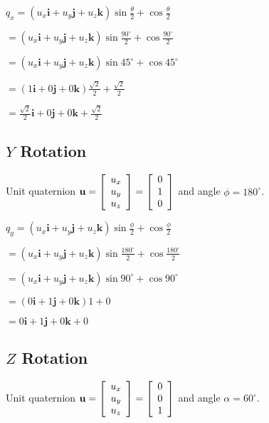 \documentclass[11pt]{article}
\begin{document}
\begin{spacing}{1.2}
$q_x
 = (u_x \mathbf{i} + u_y \mathbf{j} + u_z \mathbf{k}) \sin \frac{\theta}{2} + \cos \frac{\theta}{2}
 $
 
 $ = (u_x \mathbf{i} + u_y \mathbf{j} + u_z \mathbf{k}) \sin \frac{90^{\circ}}{2} + \cos \frac{90^{\circ}}{2}$

 $ = (u_x \mathbf{i} + u_y \mathbf{j} + u_z \mathbf{k}) \sin 45^{\circ} + \cos 45^{\circ}$

 $ = (1 \mathbf{i} + 0\mathbf{j} + 0\mathbf{k}) \frac{\sqrt2}{2} + \frac{\sqrt2}{2}$

 $ =  \frac{\sqrt2}{2}\mathbf{i} + 0\mathbf{j} + 0\mathbf{k}  + \frac{\sqrt2}{2}$

    
\subsection{$Y$ Rotation}

Unit quaternion 
$\displaystyle 
\mathbf{u} = 
\left[
	\begin{array}{c}
		u_x \cr u_y \cr u_z \cr
	\end{array}
\right]
= 
\left[
	\begin{array}{c}
		0 \cr 1 \cr 0 \cr
	\end{array}
\right]
$
and angle $\phi = 180^{\circ}$.

$q_y
 = (u_x \mathbf{i} + u_y \mathbf{j} + u_z \mathbf{k}) \sin \frac{\phi}{2} + \cos \frac{\phi}{2}
 $
 
 $ = (u_x \mathbf{i} + u_y \mathbf{j} + u_z \mathbf{k}) \sin \frac{180^{\circ}}{2} + \cos \frac{180^{\circ}}{2}$

 $ = (u_x \mathbf{i} + u_y \mathbf{j} + u_z \mathbf{k}) \sin 90^{\circ} + \cos 90^{\circ}$

 $ = (0 \mathbf{i} + 1\mathbf{j} + 0\mathbf{k}) 1 + 0$

 $ = 0 \mathbf{i} + 1\mathbf{j} + 0\mathbf{k} + 0$

\subsection{$Z$ Rotation}

Unit quaternion 
$\displaystyle 
\mathbf{u} = 
\left[
	\begin{array}{c}
		u_x \cr u_y \cr u_z \cr
	\end{array}
\right]
= 
\left[
	\begin{array}{c}
		0 \cr 0 \cr 1 \cr
	\end{array}
\right]
$
and angle $\alpha = 60^{\circ}$.


\end{spacing}
\end{document}
